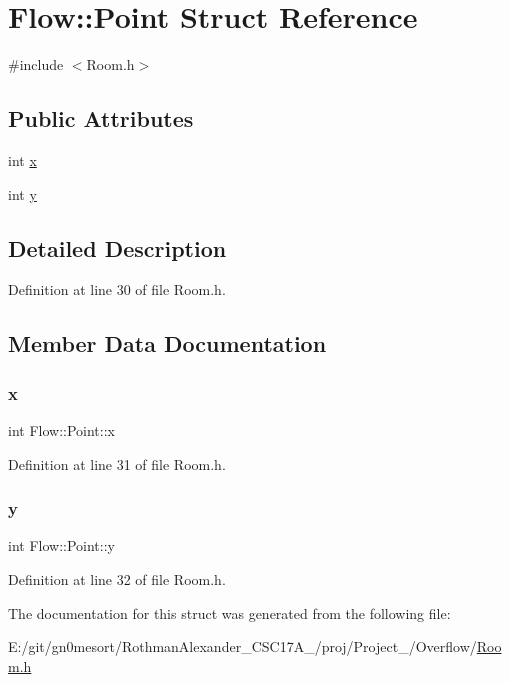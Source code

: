 \hypertarget{struct_flow_1_1_point}{}\section{Flow\+:\+:Point Struct Reference}
\label{struct_flow_1_1_point}


{\ttfamily \#include $<$Room.\+h$>$}

\subsection*{Public Attributes}
\begin{DoxyCompactItemize}
\item 
int \hyperlink{struct_flow_1_1_point_ada2d7891653124b023647a1d4852e034}{x}
\item 
int \hyperlink{struct_flow_1_1_point_ae5eebbaf5523c4eb55fee6dc4770e3d5}{y}
\end{DoxyCompactItemize}


\subsection{Detailed Description}


Definition at line 30 of file Room.\+h.



\subsection{Member Data Documentation}
\hypertarget{struct_flow_1_1_point_ada2d7891653124b023647a1d4852e034}{}\label{struct_flow_1_1_point_ada2d7891653124b023647a1d4852e034} 
\subsubsection{\texorpdfstring{x}{x}}
{\footnotesize\ttfamily int Flow\+::\+Point\+::x}



Definition at line 31 of file Room.\+h.

\hypertarget{struct_flow_1_1_point_ae5eebbaf5523c4eb55fee6dc4770e3d5}{}\label{struct_flow_1_1_point_ae5eebbaf5523c4eb55fee6dc4770e3d5} 
\subsubsection{\texorpdfstring{y}{y}}
{\footnotesize\ttfamily int Flow\+::\+Point\+::y}



Definition at line 32 of file Room.\+h.



The documentation for this struct was generated from the following file\+:\begin{DoxyCompactItemize}
\item 
E\+:/git/gn0mesort/\+Rothman\+Alexander\+\_\+\+C\+S\+C17\+A\+\_/proj/\+Project\+\_/\+Overflow/\hyperlink{_room_8h}{Room.\+h}\end{DoxyCompactItemize}
